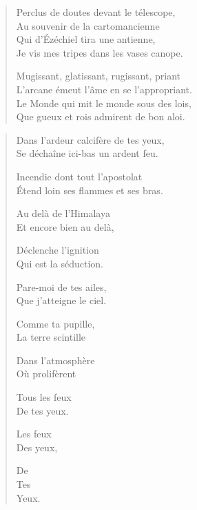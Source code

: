 \begin{verse}
  Perclus de doutes devant le télescope,\\  %
  Au souvenir de la cartomancienne\\  %
  Qui d’Ézéchiel tira une antienne,\\  %
  Je vis mes tripes dans les vases canope.

  Mugissant, glatissant, rugissant, priant\\  %
  L’arcane émeut l’âme en se l’appropriant.\\  %
  Le Monde qui mit le monde sous des lois,\\  %
  Que gueux et rois admirent de bon aloi.
\end{verse}

\begin{verse}%
  \distique%
  Dans l’ardeur calcifère de tes yeux,\\  %
  Se déchaîne ici-bas un ardent feu.

  Incendie dont tout l’apostolat\\  %
  Étend loin ses flammes et ses bras.

  Au delà de l’Himalaya\\  %
  Et encore bien au delà,

  Déclenche l’ignition\\  %
  Qui est la séduction.

  Pare-moi de tes ailes,\\  %
  Que j’atteigne le ciel.

  Comme ta pupille,\\  %
  La terre scintille

  Dans l’atmosphère\\  %
  Où  prolifèrent

  Tous les feux\\  %
  De tes yeux.

  Les feux\\  %
  Des yeux,

  De\\  %
  Tes\\  %
  Yeux.
\end{verse}




